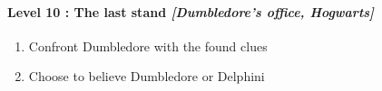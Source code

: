 \paragraph{Level 10 : The last stand \textit{[Dumbledore's office, Hogwarts]}}
\begin{enumerate}[1)]
	\item Confront Dumbledore with the found clues
	\item Choose to believe Dumbledore or Delphini
\end{enumerate}

\pagebreak

